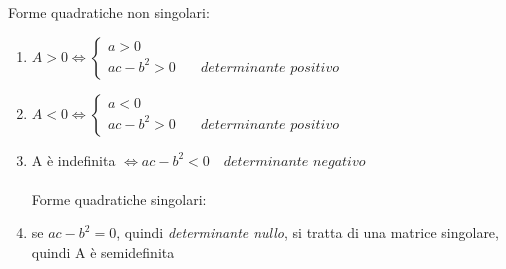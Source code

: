 \documentclass[12pt]{article}
\begin{document}
Forme quadratiche non singolari:
\begin{enumerate}
    \item $A > 0 \Leftrightarrow
              \begin{cases}
                  a > 0                                             \\
                  ac-b^2 > 0 & \quad \textit{determinante positivo}
              \end{cases} $
    \item $A < 0 \Leftrightarrow
              \begin{cases}
                  a < 0                                             \\
                  ac-b^2 > 0 & \quad \textit{determinante positivo}
              \end{cases} $
    \item A è indefinita $\Leftrightarrow ac-b^2<0 \quad \textit{determinante negativo}$
          \\
          \\Forme quadratiche singolari:
    \item se $ac-b^2 = 0$, quindi \textit{determinante nullo}, si tratta di una matrice singolare, quindi A è semidefinita
\end{enumerate}
\end{document}
